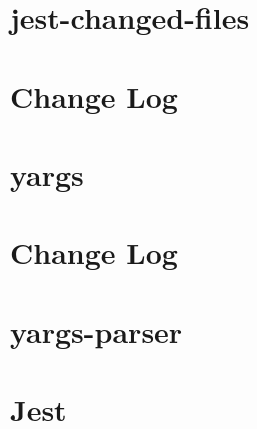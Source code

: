 \documentclass[twoside]{book}
\newcommand{\+}{\discretionary{\mbox{\scriptsize$\hookleftarrow$}}{}{}}
\begin{document}
\chapter{jest-\/changed-\/files}
\label{md__c_1_workspace_demo_src_main_script_node_modules_jest-changed-files__r_e_a_d_m_e}

\chapter{Change Log}
\label{md__c_1_workspace_demo_src_main_script_node_modules_jest-cli_node_modules_yargs__c_h_a_n_g_e_l_o_g}

\chapter{yargs}
\label{md__c_1_workspace_demo_src_main_script_node_modules_jest-cli_node_modules_yargs__r_e_a_d_m_e}

\chapter{Change Log}
\label{md__c_1_workspace_demo_src_main_script_node_modules_jest-cli_node_modules_yargs-parser__c_h_a_n_g_e_l_o_g}

\chapter{yargs-\/parser}
\label{md__c_1_workspace_demo_src_main_script_node_modules_jest-cli_node_modules_yargs-parser__r_e_a_d_m_e}

\chapter{Jest}
\label{md__c_1_workspace_demo_src_main_script_node_modules_jest-cli__r_e_a_d_m_e}

\end{document}
